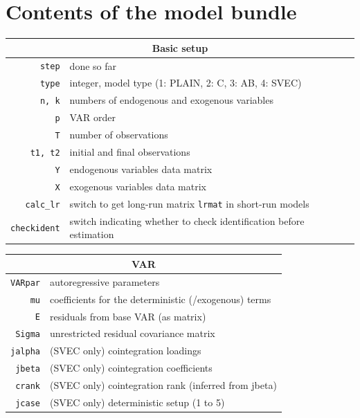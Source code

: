 \documentclass[a4paper,10pt]{article}
\begin{document}
\section{Contents of the model bundle}

\label{sec:bundle_struct}

  \centering
  \begin{tabular}{rp{}}
    \hline
    \multicolumn{2}{c}{\textbf{Basic setup}} \\
    \hline
    \texttt{step} & done so far \\
    \texttt{type} & integer, model type (1: PLAIN, 2: C, 3: AB, 4: SVEC)\\
    \texttt{n, k}	  & numbers of endogenous and exogenous variables \\
    \texttt{p}	  & VAR order \\
    \texttt{T}	  & number of observations \\
    \texttt{t1, t2}	  & initial and final observations \\
    \texttt{Y}	  & endogenous variables data matrix \\
    \texttt{X}	  & exogenous variables data matrix \\
    \texttt{calc\_lr} & switch to get long-run matrix \texttt{lrmat} in short-run models \\ 
    \texttt{checkident} & switch indicating whether to check identification before 
    estimation\\
    \end{tabular}
    
    \begin{tabular}{rp{}}
    \hline
    \multicolumn{2}{c}{\textbf{VAR}} \\
    \hline
    \texttt{VARpar} & autoregressive parameters \\
    \texttt{mu}	    & coefficients for the deterministic (/exogenous) terms \\
    \texttt{E}	    & residuals from base VAR (as matrix) \\
    \texttt{Sigma}  & unrestricted residual covariance matrix \\
    \texttt{jalpha} & (SVEC only) cointegration loadings \\
    \texttt{jbeta}  & (SVEC only) cointegration coefficients \\
    \texttt{crank} & (SVEC only) cointegration rank (inferred from jbeta)\\
    \texttt{jcase} & (SVEC only) deterministic setup (1 to 5)\\
     \end{tabular}
    
\end{document}
